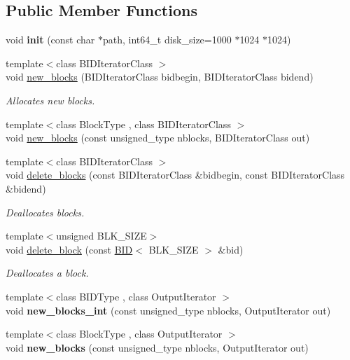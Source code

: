 \subsection*{Public Member Functions}
\begin{CompactItemize}
\item 
\hypertarget{group__mnglayer_g9d954d295ff1cb73cffd1075e58d6ab5}{
void \textbf{init} (const char $\ast$path, int64\_\-t disk\_\-size=1000 $\ast$1024 $\ast$1024)}
\label{group__mnglayer_g9d954d295ff1cb73cffd1075e58d6ab5}

\item 
{\footnotesize template$<$class BIDIteratorClass $>$ }\\void \hyperlink{group__mnglayer_gb012fd7abe2b4b529b9f6b339aff4232}{new\_\-blocks} (BIDIteratorClass bidbegin, BIDIteratorClass bidend)
\begin{CompactList}\small\item\em Allocates new blocks. \item\end{CompactList}\item 
{\footnotesize template$<$class BlockType , class BIDIteratorClass $>$ }\\void \hyperlink{group__mnglayer_ge77531e60b365f05da213ba7d8b17c9a}{new\_\-blocks} (const unsigned\_\-type nblocks, BIDIteratorClass out)
\item 
{\footnotesize template$<$class BIDIteratorClass $>$ }\\void \hyperlink{group__mnglayer_g0a41492a2faef107fb3c5a7c1ce5ee2d}{delete\_\-blocks} (const BIDIteratorClass \&bidbegin, const BIDIteratorClass \&bidend)
\begin{CompactList}\small\item\em Deallocates blocks. \item\end{CompactList}\item 
{\footnotesize template$<$unsigned BLK\_\-SIZE$>$ }\\void \hyperlink{group__mnglayer_g021e2ef7f3d56eb6dda56958ff5e0739}{delete\_\-block} (const \hyperlink{structBID}{BID}$<$ BLK\_\-SIZE $>$ \&bid)
\begin{CompactList}\small\item\em Deallocates a block. \item\end{CompactList}\item 
\hypertarget{group__mnglayer_g7f79d73b67f9353279c7da98450bb2da}{
{\footnotesize template$<$class BIDType , class OutputIterator $>$ }\\void \textbf{new\_\-blocks\_\-int} (const unsigned\_\-type nblocks, OutputIterator out)}
\label{group__mnglayer_g7f79d73b67f9353279c7da98450bb2da}

\item 
\hypertarget{group__mnglayer_gb141f255591ea232174c110922490f3b}{
{\footnotesize template$<$class BlockType , class OutputIterator $>$ }\\void \textbf{new\_\-blocks} (const unsigned\_\-type nblocks, OutputIterator out)}
\label{group__mnglayer_gb141f255591ea232174c110922490f3b}

\end{CompactItemize}
